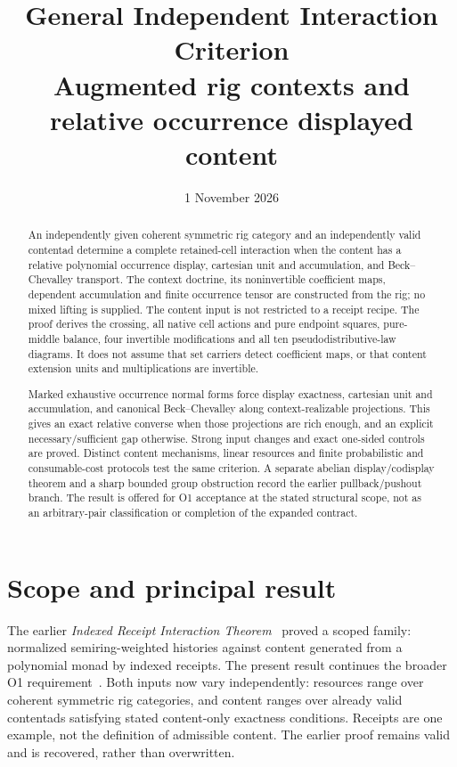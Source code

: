 \documentclass[11pt,a4paper]{article}
\title{General Independent Interaction Criterion\\[5pt]
\large Augmented rig contexts and relative occurrence displayed content}
\author{}
\date{1 November 2026}
\theoremstyle{definition}
\begin{document}
\maketitle

\begin{abstract}
An independently given coherent symmetric rig category and an independently
valid contentad determine a complete retained-cell interaction when the content
has a relative polynomial occurrence display, cartesian unit and accumulation,
and Beck--Chevalley transport. The context doctrine, its noninvertible
coefficient maps, dependent accumulation and finite occurrence tensor are
constructed from the rig; no mixed lifting is supplied. The content input is
not restricted to a receipt recipe. The proof derives the crossing, all native
cell actions and pure endpoint squares, pure-middle balance, four invertible
modifications and all ten pseudodistributive-law diagrams. It does not assume
that set carriers detect coefficient maps, or that content extension units and
multiplications are invertible.

Marked exhaustive occurrence normal forms force display exactness, cartesian
unit and accumulation, and canonical Beck--Chevalley along context-realizable
projections. This gives an exact relative converse when those projections are
rich enough, and an explicit necessary/sufficient gap otherwise. Strong input
changes and exact one-sided controls are proved. Distinct content mechanisms,
linear resources and finite probabilistic and consumable-cost protocols test
the same criterion. A separate abelian display/codisplay theorem and a sharp
bounded group obstruction record the earlier pullback/pushout branch.
The result is offered for O1 acceptance at the stated structural scope, not as
an arbitrary-pair classification or completion of the expanded contract.
\end{abstract}

\tableofcontents

\section{Scope and principal result}\label{sec:scope}

The earlier \emph{Indexed Receipt Interaction Theorem}~\cite{Receipt} proved a
scoped family: normalized semiring-weighted histories against content generated
from a polynomial monad by indexed receipts. The present result continues the
broader O1 requirement~\cite{Contract}. Both inputs now vary independently:
resources range over coherent symmetric rig categories, and content ranges over
already valid contentads satisfying stated content-only exactness conditions.
Receipts are one example, not the definition of admissible content. The earlier
proof remains valid and is recovered, rather than overwritten.
\end{document}
